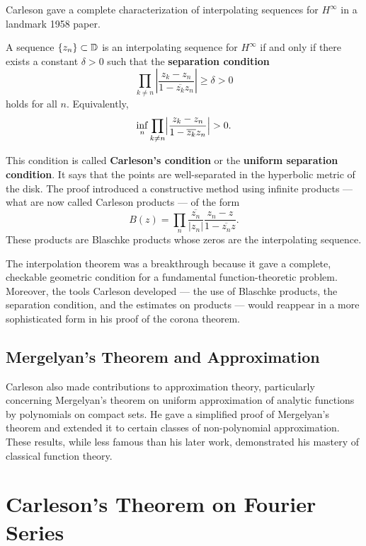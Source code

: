 Carleson gave a complete characterization of interpolating sequences for \(H^\infty\) in a landmark 1958 paper.

\begin{theorem}
A sequence \(\{z_n\} \subset \mathbb{D}\) is an interpolating sequence for \(H^\infty\) if and only if there exists a constant \(\delta > 0\) such that the \textbf{separation condition}
\[
\prod_{k \neq n} \left|\frac{z_k - z_n}{1 - \overline{z_k}z_n}\right| \geq \delta > 0
\]
holds for all \(n\). Equivalently,
\[
\inf_n \prod_{k \neq n} \Bigl|\frac{z_k - z_n}{1 - \overline{z_k}z_n}\Bigr| > 0.
\]
\end{theorem}

This condition is called \textbf{Carleson's condition} or the \textbf{uniform separation condition}. It says that the points are well-separated in the hyperbolic metric of the disk. The proof introduced a constructive method using infinite products --- what are now called Carleson products --- of the form
\[
B(z) = \prod_n \frac{\overline{z_n}}{|z_n|} \frac{z_n - z}{1 - \overline{z_n}z}.
\]
These products are Blaschke products whose zeros are the interpolating sequence.

The interpolation theorem was a breakthrough because it gave a complete, checkable geometric condition for a fundamental function-theoretic problem. Moreover, the tools Carleson developed --- the use of Blaschke products, the separation condition, and the estimates on products --- would reappear in a more sophisticated form in his proof of the corona theorem.

\subsection{Mergelyan's Theorem and Approximation}

Carleson also made contributions to approximation theory, particularly concerning Mergelyan's theorem on uniform approximation of analytic functions by polynomials on compact sets. He gave a simplified proof of Mergelyan's theorem and extended it to certain classes of non-polynomial approximation. These results, while less famous than his later work, demonstrated his mastery of classical function theory.

\section{Carleson's Theorem on Fourier Series}

